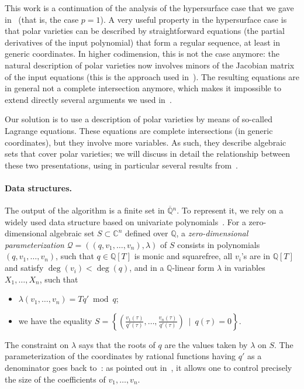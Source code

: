 \documentclass[12pt]{article}
\def\scrQ{\ensuremath{\mathscr{Q}}}
\def\C{\mathbb{C}}
\def\Q{\mathbb{Q}}
\begin{document}
This work is a continuation of the analysis of the hypersurface case
that we gave in~\cite{ElGiSc20} (that is, the case $p=1$). A very
useful property in the hypersurface case is that polar varieties can
be described by straightforward equations (the partial derivatives of
the input polynomial) that form a regular sequence, at least in
generic coordinates. In higher codimension, this is not the case
anymore: the natural description of polar varieties now involves
minors of the Jacobian matrix of the input equations (this is the
approach used in~\cite{EMP}). The resulting equations are in general
not a complete intersection anymore, which makes it impossible to
extend directly several arguments we used in~\cite{ElGiSc20}.

Our solution is to use a description of polar varieties by means of
so-called Lagrange equations. These equations are complete
intersections (in generic coordinates), but they involve more
variables. As such, they describe algebraic sets that cover polar
varieties; we will discuss in detail the relationship between these
two presentations, using in particular several results
from~\cite{BaGiHeSaSh10,TWT}.


\paragraph*{Data structures.} 
The output of the algorithm is a finite set in $\overline{\Q}{}^n$. To
represent it, we rely on a widely used data structure based on
univariate
polynomials~\cite{Kronecker82,Macaulay16,GiMo89,GiHeMoPa95,ABRW,GiHaHeMoMoPa97,GiHeMoMoPa98,Rouillier99}.
For a zero-dimensional algebraic set $S \subset \C^n$ defined over
$\Q$, a {\em zero-dimensional parameterization}
$\scrQ=((q,v_1,\dots,v_n),\lambda)$ of $S$ consists in polynomials
$(q,v_1,\dots,v_n)$, such that $q\in \Q[T]$ is monic and squarefree,
all $v_i$'s are in $\Q[T]$ and satisfy $\deg(v_i) < \deg(q)$, and in a
$\Q$-linear form $\lambda$ in variables $X_1,\dots,X_n$, such that
\begin{itemize}
\item $\lambda(v_1,\dots,v_n)=T q' \bmod q$;
\item we have the equality
  $S=\left \{\left(
      \frac{v_1(\tau)}{q'(\tau)},\dots,\frac{v_n(\tau)}{q'(\tau)}\right
    ) \ \mid \ q(\tau)=0 \right \}.$
\end{itemize}
The constraint on $\lambda$ says that the roots of $q$ are the values
taken by $\lambda$ on $S$. The parameterization of the coordinates by
rational functions having $q'$ as a denominator goes back
to~\cite{Kronecker82,Macaulay16}: as pointed out in~\cite{ABRW}, it
allows one to control precisely the size of the coefficients of
$v_1,\dots,v_n$.
\end{document}
